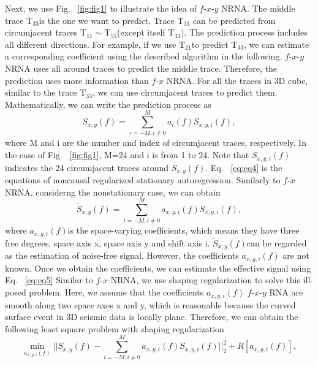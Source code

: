 Next, we use Fig. ~\ref{fig:fig1} to illustrate the idea of $f$-$x$-$y$ NRNA. The middle trace 
${{\text{T}}_{\text{33}}}$is the one we want to predict. Trace ${{\text{T}}_{\text{33}}}$ 
can be predicted from circumjacent traces ${{\text{T}}_{11}}\sim {{\text{T}}_{55}}$(except 
itself ${{\text{T}}_{\text{33}}}$). The prediction process includes all different directions. 
For example, if we use ${{\text{T}}_{21}}$to predict ${{\text{T}}_{\text{33}}}$, we can 
estimate a corresponding coefficient using the described algorithm in the following. $f$-$x$-$y$ 
NRNA uses all around traces to predict the middle trace. Therefore, the prediction uses more 
information than $f$-$x$ NRNA. For all the traces in 3D cube, similar to the trace ${{\text{T}}_{\text{33}}}$, 
we can use circumjacent traces to predict them. Mathematically, we can write the prediction process as
      \begin{equation} 
          {{S}_{x,y}}(f)=\sum\limits_{i=-M,i\ne 0}^{M}{{{a}_{i}}(f){{S}_{x,y,i}}(f)},
        \label{eq:eq4}
      \end{equation}
where M and i are the number and index of circumjacent traces, respectively. In the case of Fig. ~\ref{fig:fig1}, 
M=24 and i is from 1 to 24. Note that ${{S}_{x,y,i}}(f)$indicates the 24 circumjacent traces around
 ${{S}_{x,y}}(f)$. Eq. ~\ref{eq:eq4} is the equations of noncausal regularized stationary autoregression. 
Similarly to $f$-$x$ NRNA, considerng the nonstationary case, we can obtain
      \begin{equation}
          {{\tilde{S}}_{x,y}}(f)=\sum\limits_{i=-M,i\ne 0}^{M}{{{a}_{x,y,i}}(f){{S}_{x,y,i}}(f)},
        \label{eq:eq5}
      \end{equation}
where ${{a}_{x,y,i}}(f)$is the space-varying coefficients, which means they have three free degrees, 
space axis x, space axis y and shift axis i. ${{\tilde{S}}_{x,y}}(f)$can be regarded as the 
estimation of noise-free signal. However, the coefficients ${{a}_{x,y,i}}(f)$ are not 
known. Once we obtain the coefficients, we can estimate the effective signal using 
Eq. ~\ref{eq:eq5} Similar to $f$-$x$ NRNA, we use shaping regularization to solve this ill-posed 
problem. Here, we assume that the coefficients ${{a}_{x,y,i}}(f)$ $f$-$x$-$y$ RNA are 
smooth along two space axes x and y, which is reasonable because the curved surface 
event in 3D seismic data is locally plane. Therefore, we can obtain the following 
least square problem with shaping regularization
      \begin{equation}
          \min_{a_{x,y,i}(f)}||{{S}_{x,y}}(f)-\sum\limits_{i=-M,i\ne 0}^{M}{{{a}_{x,y,i}}(f){{S}_{x,y,i}}(f)}||_{2}^{2}+R[{{a}_{x,y,i}}(f)],
        \label{eq:eq6}
      \end{equation}
